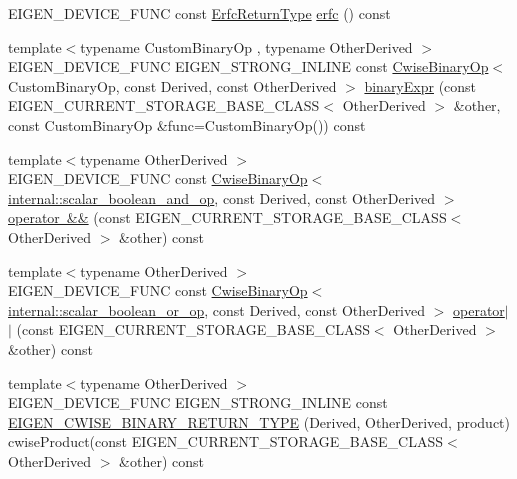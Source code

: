 \begin{DoxyCompactItemize}
\item 
E\+I\+G\+E\+N\+\_\+\+D\+E\+V\+I\+C\+E\+\_\+\+F\+U\+NC const \mbox{\hyperlink{class_eigen_1_1_cwise_unary_op}{Erfc\+Return\+Type}} \mbox{\hyperlink{class_eigen_1_1_array_base_a0b5dc4e2072be63b4920f7b88dc1bf83}{erfc}} () const
\item 
{\footnotesize template$<$typename Custom\+Binary\+Op , typename Other\+Derived $>$ }\\E\+I\+G\+E\+N\+\_\+\+D\+E\+V\+I\+C\+E\+\_\+\+F\+U\+NC E\+I\+G\+E\+N\+\_\+\+S\+T\+R\+O\+N\+G\+\_\+\+I\+N\+L\+I\+NE const \mbox{\hyperlink{class_eigen_1_1_cwise_binary_op}{Cwise\+Binary\+Op}}$<$ Custom\+Binary\+Op, const Derived, const Other\+Derived $>$ \mbox{\hyperlink{class_eigen_1_1_array_base_a97444338583fdd6ea18b4a3ae8e1553b}{binary\+Expr}} (const E\+I\+G\+E\+N\+\_\+\+C\+U\+R\+R\+E\+N\+T\+\_\+\+S\+T\+O\+R\+A\+G\+E\+\_\+\+B\+A\+S\+E\+\_\+\+C\+L\+A\+SS$<$ Other\+Derived $>$ \&other, const Custom\+Binary\+Op \&func=Custom\+Binary\+Op()) const
\item 
{\footnotesize template$<$typename Other\+Derived $>$ }\\E\+I\+G\+E\+N\+\_\+\+D\+E\+V\+I\+C\+E\+\_\+\+F\+U\+NC const \mbox{\hyperlink{class_eigen_1_1_cwise_binary_op}{Cwise\+Binary\+Op}}$<$ \mbox{\hyperlink{struct_eigen_1_1internal_1_1scalar__boolean__and__op}{internal\+::scalar\+\_\+boolean\+\_\+and\+\_\+op}}, const Derived, const Other\+Derived $>$ \mbox{\hyperlink{class_eigen_1_1_array_base_a1b3cb3e9a6f1c1e9168e963cb6e8db62}{operator \&\&}} (const E\+I\+G\+E\+N\+\_\+\+C\+U\+R\+R\+E\+N\+T\+\_\+\+S\+T\+O\+R\+A\+G\+E\+\_\+\+B\+A\+S\+E\+\_\+\+C\+L\+A\+SS$<$ Other\+Derived $>$ \&other) const
\item 
{\footnotesize template$<$typename Other\+Derived $>$ }\\E\+I\+G\+E\+N\+\_\+\+D\+E\+V\+I\+C\+E\+\_\+\+F\+U\+NC const \mbox{\hyperlink{class_eigen_1_1_cwise_binary_op}{Cwise\+Binary\+Op}}$<$ \mbox{\hyperlink{struct_eigen_1_1internal_1_1scalar__boolean__or__op}{internal\+::scalar\+\_\+boolean\+\_\+or\+\_\+op}}, const Derived, const Other\+Derived $>$ \mbox{\hyperlink{class_eigen_1_1_array_base_a7c2e31673c2243b135e13de05de6e636}{operator$\vert$$\vert$}} (const E\+I\+G\+E\+N\+\_\+\+C\+U\+R\+R\+E\+N\+T\+\_\+\+S\+T\+O\+R\+A\+G\+E\+\_\+\+B\+A\+S\+E\+\_\+\+C\+L\+A\+SS$<$ Other\+Derived $>$ \&other) const
\item 
{\footnotesize template$<$typename Other\+Derived $>$ }\\E\+I\+G\+E\+N\+\_\+\+D\+E\+V\+I\+C\+E\+\_\+\+F\+U\+NC E\+I\+G\+E\+N\+\_\+\+S\+T\+R\+O\+N\+G\+\_\+\+I\+N\+L\+I\+NE const \mbox{\hyperlink{class_eigen_1_1_array_base_a8d6fa230936f9b87bc720b5c802fbf35}{E\+I\+G\+E\+N\+\_\+\+C\+W\+I\+S\+E\+\_\+\+B\+I\+N\+A\+R\+Y\+\_\+\+R\+E\+T\+U\+R\+N\+\_\+\+T\+Y\+PE}} (Derived, Other\+Derived, product) cwise\+Product(const E\+I\+G\+E\+N\+\_\+\+C\+U\+R\+R\+E\+N\+T\+\_\+\+S\+T\+O\+R\+A\+G\+E\+\_\+\+B\+A\+S\+E\+\_\+\+C\+L\+A\+SS$<$ Other\+Derived $>$ \&other) const

\end{DoxyCompactItemize}
